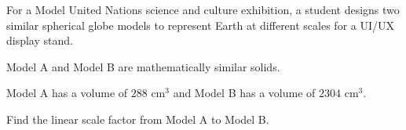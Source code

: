 \begin{question}
\noindent For a Model United Nations science and culture exhibition, a student designs two similar spherical globe models to represent Earth at different scales for a UI/UX display stand.

\begin{center}
\end{center}

\noindent Model A and Model B are mathematically similar solids.

Model A has a volume of $288$ cm$^3$ and Model B has a volume of $2304$ cm$^3$.

Find the linear scale factor from Model A to Model B.

\vspace{4cm}
\end{question}
